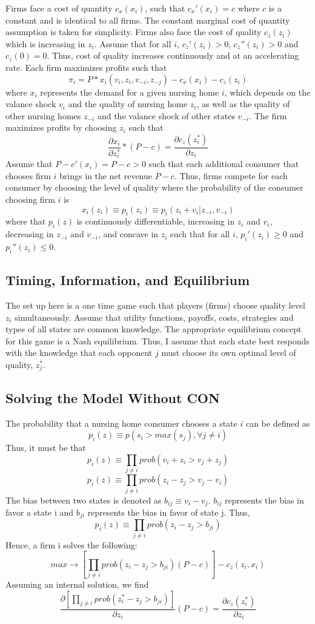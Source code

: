 \documentclass[../Main.tex]{subfiles}
\begin{document}
Firms face a cost of quantity $c_x(x_i)$, such that $c_x'(x_i)=c$ where $c$ is a constant and is identical to all firms. The constant marginal cost of quantity assumption is taken for simplicity. Firms also face the cost of quality $c_z(z_i) $ which is increasing in $z_i$. Assume that for all $i$, $c_z'(z_i)>0$, $c_z''(z_i)>0$ and $c_z(0)=0$. Thus, cost of quality increases continuously and at an accelerating rate. Each firm maximizes profits such that $$\pi_i = P*x_i(v_i, z_i, v_{-i}, z_{-j}) -c_x(x_i) -c_z(z_i) $$ 
where $x_i$ represents the demand for a given nursing home $i$, which depends on the valance shock $v_i$ and the quality of nursing home $z_i$, as well as the quality of other nursing homes $z_{-i}$ and the valance shock of other states $v_{-i}$. The firm maximizes profits by choosing $z_i$ such that $$ \frac{\partial x_i}{\partial z_i^*}*(P-c)= \frac{\partial c_z(z_i^*)}{\partial z_i} $$ Assume that $P - c'(x_i)= P - c > 0$ such that each additional consumer that chooses firm $i$ brings in the net revenue $P - c$. Thus, firms compete for each consumer by choosing the level of quality where the probability of the consumer choosing firm $i$ is $$ x_{i}(z_i) \equiv p_i(z_i) \equiv p_i(z_i + v_i |z_{-i}, v_{-i}) $$
where that $p_{i}(z)$ is continuously differentiable, increasing in $z_i$ and $v_i$, decreasing in $z_{-i}$ and $v_{-i}$, and concave in $z_i$ such that for all $i$, $p_{i}'(z_i)\geq 0$ and $p_{i}''(z_i) \leq 0$.

\subsection{Timing, Information, and Equilibrium}
The set up here is a one time game such that players (firms) choose quality level $z_i$ simultaneously. Assume that utility functions, payoffs, costs, strategies and types of all states are common knowledge. The appropriate equilibrium concept for this game is a Nash equilibrium. Thus, I assume that each state best responds with the knowledge that each opponent $j$ must choose its own optimal level of quality, $z_j^*$.

\subsection{Solving the Model Without CON}
The probability that a nursing home consumer chooses a state $i$ can be defined as $$p_i(z) \equiv p(s_i> max(s_j), \forall j \neq i )$$
Thus, it must be that $$p_i(z) \equiv \prod_{j\neq i} prob(v_i + z_i > v_j + z_j) $$ 
 $$p_i(z) \equiv \prod_{j\neq i} prob(z_i-z_j > v_j - v_i) $$ 
The bias between two states is denoted as $b_{ij} \equiv v_i -v_j $. $b_{ij}$ represents the bias in favor a state i and $b_{ji}$ represents the bias in favor of state j. Thus,$$p_i(z) \equiv \prod_{j\neq i} prob(z_i -z_j > b_{ji}) $$  
Hence, a firm i solves the following:$$max \rightarrow [\prod_{j\neq i} prob(z_i -z_j > b_{ji})(P-c)] - c_z(z_i,x_i)$$
Assuming an internal solution, we find 
 $$\frac{\partial [\prod_{j\neq i} prob(z_i^* -z_j > b_{ji})]}{\partial z_i}(P-c) = \frac{\partial c_z(z_i^*)}{\partial z_i}$$
\end{document}
